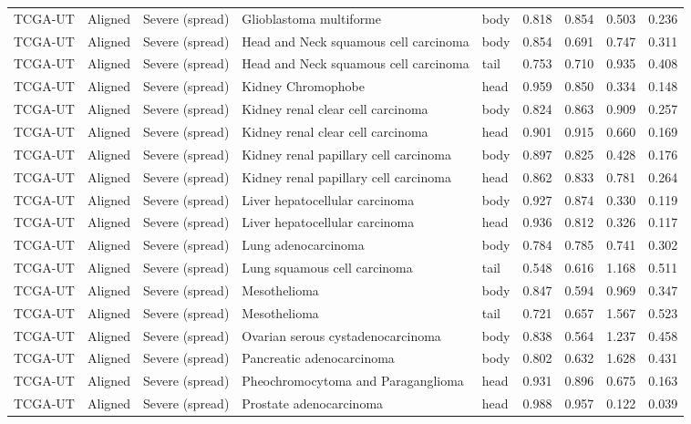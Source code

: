 \begin{longtable}{lllllrrrr}
TCGA-UT & Aligned & Severe (spread) & Glioblastoma multiforme & body & 0.818 & 0.854 & 0.503 & 0.236 \\
TCGA-UT & Aligned & Severe (spread) & Head and Neck squamous cell carcinoma & body & 0.854 & 0.691 & 0.747 & 0.311 \\
TCGA-UT & Aligned & Severe (spread) & Head and Neck squamous cell carcinoma & tail & 0.753 & 0.710 & 0.935 & 0.408 \\
TCGA-UT & Aligned & Severe (spread) & Kidney Chromophobe & head & 0.959 & 0.850 & 0.334 & 0.148 \\
TCGA-UT & Aligned & Severe (spread) & Kidney renal clear cell carcinoma & body & 0.824 & 0.863 & 0.909 & 0.257 \\
TCGA-UT & Aligned & Severe (spread) & Kidney renal clear cell carcinoma & head & 0.901 & 0.915 & 0.660 & 0.169 \\
TCGA-UT & Aligned & Severe (spread) & Kidney renal papillary cell carcinoma & body & 0.897 & 0.825 & 0.428 & 0.176 \\
TCGA-UT & Aligned & Severe (spread) & Kidney renal papillary cell carcinoma & head & 0.862 & 0.833 & 0.781 & 0.264 \\
TCGA-UT & Aligned & Severe (spread) & Liver hepatocellular carcinoma & body & 0.927 & 0.874 & 0.330 & 0.119 \\
TCGA-UT & Aligned & Severe (spread) & Liver hepatocellular carcinoma & head & 0.936 & 0.812 & 0.326 & 0.117 \\
TCGA-UT & Aligned & Severe (spread) & Lung adenocarcinoma & body & 0.784 & 0.785 & 0.741 & 0.302 \\
TCGA-UT & Aligned & Severe (spread) & Lung squamous cell carcinoma & tail & 0.548 & 0.616 & 1.168 & 0.511 \\
TCGA-UT & Aligned & Severe (spread) & Mesothelioma & body & 0.847 & 0.594 & 0.969 & 0.347 \\
TCGA-UT & Aligned & Severe (spread) & Mesothelioma & tail & 0.721 & 0.657 & 1.567 & 0.523 \\
TCGA-UT & Aligned & Severe (spread) & Ovarian serous cystadenocarcinoma & body & 0.838 & 0.564 & 1.237 & 0.458 \\
TCGA-UT & Aligned & Severe (spread) & Pancreatic adenocarcinoma & body & 0.802 & 0.632 & 1.628 & 0.431 \\
TCGA-UT & Aligned & Severe (spread) & Pheochromocytoma and Paraganglioma & head & 0.931 & 0.896 & 0.675 & 0.163 \\
TCGA-UT & Aligned & Severe (spread) & Prostate adenocarcinoma & head & 0.988 & 0.957 & 0.122 & 0.039 \\

\end{longtable}
